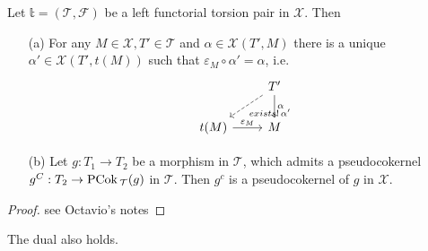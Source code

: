 \begin{rmk}
  Let $\mathbb{t}=(\mathcal{T},\mathcal{F})$ be a left functorial torsion pair in $\mathcal{X}$.
  Then
  \begin{enumerate}
    \item[(a)] For any $M\in\mathcal{X}, T'\in\mathcal{T}$ and $\alpha\in\mathcal{X}(T',M)$ there
    is a unique $\alpha'\in\mathcal{X}(T',t(M))$ such that $\varepsilon_M\circ\alpha'=\alpha$, i.e.
    \begin{equation*}
      \begin{tikzcd}
        & T'\arrow[dashed]{ld}{exists!\,\alpha'}\arrow{d}{\alpha}\\
        t(M)\arrow{r}{\varepsilon_M}&M
      \end{tikzcd}
    \end{equation*}
    \item[(b)] Let $g:T_1\to T_2$ be a morphism in $\mathcal{T}$, which admits a pseudocokernel
    $g^C:T_2\to\mathrm{\textup{PCok\,}}_\mathcal{T}(g)$ in $\mathcal{T}$. Then $g^c$ is a pseudocokernel of $g$
    in $\mathcal{X}$.
  \end{enumerate}
\end{rmk}

\begin{proof}
  see Octavio's notes
\end{proof}

The dual also holds.
